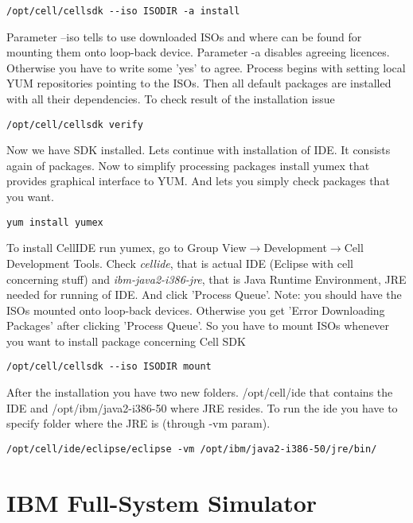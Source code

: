 \begin{verbatim}
/opt/cell/cellsdk --iso ISODIR -a install
\end{verbatim}

Parameter --iso tells to use downloaded ISOs and where can be found for mounting them onto loop-back device.
Parameter -a disables agreeing licences. Otherwise you have to write some 'yes' to agree.
Process begins with setting local YUM repositories pointing to the ISOs.
Then all default packages are installed with all their dependencies.
To check result of the installation issue

\begin{verbatim}
/opt/cell/cellsdk verify
\end{verbatim}

Now we have SDK installed. Lets continue with installation of IDE.
It consists again of packages.
Now to simplify processing packages install yumex that provides graphical interface to YUM.
And lets you simply check packages that you want.

\begin{verbatim}
yum install yumex
\end{verbatim}

To install CellIDE run yumex, go to Group View$\rightarrow$Development$\rightarrow$Cell Development Tools.
Check \textit{cellide}, that is actual IDE (Eclipse with cell concerning stuff) and \textit{ibm-java2-i386-jre}, that is Java Runtime Environment, JRE needed for running of IDE.
And click 'Process Queue'. Note: you should have the ISOs mounted onto loop-back devices.
Otherwise you get 'Error Downloading Packages' after clicking 'Process Queue'.
So you have to mount ISOs whenever you want to install package concerning Cell SDK

\begin{verbatim}
/opt/cell/cellsdk --iso ISODIR mount
\end{verbatim}

After the installation you have two new folders.
/opt/cell/ide that contains the IDE and /opt/ibm/java2-i386-50 where JRE resides.
To run the ide you have to specify folder where the JRE is (through -vm param).

\begin{verbatim}
/opt/cell/ide/eclipse/eclipse -vm /opt/ibm/java2-i386-50/jre/bin/
\end{verbatim}

\section{IBM Full-System Simulator}


